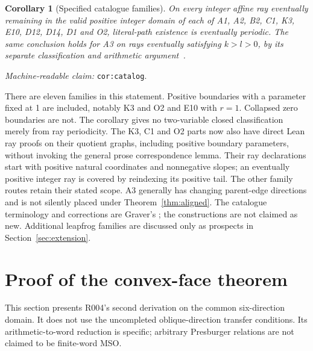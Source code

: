 \documentclass[11pt]{amsart}
\newcommand{\record}[1]{\nolinkurl{#1}}
\newcommand{\claimid}[1]{\par\nopagebreak\noindent\textit{Machine-readable claim:} \record{#1}.\par}
\newtheorem{catalogcor}{Corollary}
\theoremstyle{definition}\newtheorem{definition}{Definition}
\begin{document}
\begin{catalogcor}[Specified catalogue families]\label{cor:catalog}
On every integer affine ray eventually remaining in the valid positive
integer domain of each of A1, A2, B2, C1, K3, E10, D12, D14, D1 and O2,
literal-path existence is eventually periodic. The same conclusion
holds for A3 on rays eventually satisfying $k>l>0$, by its separate
classification and arithmetic argument~\cite{A3}.
\end{catalogcor}
\claimid{cor:catalog}
There are eleven families in this statement. Positive boundaries with
a parameter fixed at 1 are included, notably K3 and O2 and E10 with
$r=1$. Collapsed zero boundaries are not. The corollary gives no
two-variable closed classification merely from ray periodicity.
The K3, C1 and O2 parts now also have direct Lean ray proofs on their
quotient graphs, including positive boundary parameters, without invoking the
general prose correspondence lemma. Their ray declarations start with
positive natural coordinates and nonnegative slopes; an eventually positive
integer ray is covered by reindexing its positive tail. The other family
routes retain their stated scope.
A3 generally has changing parent-edge directions and is not silently
placed under Theorem~\ref{thm:aligned}. The catalogue terminology and
corrections are Graver's \cite{Graver}; the constructions are not claimed
as new. Additional leapfrog families are discussed only as prospects
in Section~\ref{sec:extension}.

\section{Proof of the convex-face theorem}\label{sec:proof}
This section presents R004's second derivation on the common
six-direction domain. It does not use the uncompleted oblique-direction
transfer conditions. Its arithmetic-to-word reduction is specific;
arbitrary Presburger relations are not claimed to be finite-word MSO.
\end{document}
